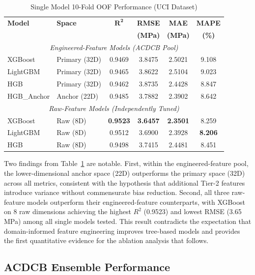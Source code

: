 \documentclass[journal]{IEEEtran}
\begin{document}
\begin{table}[!t]
\renewcommand{\arraystretch}{1.2}
\caption{Single Model 10-Fold OOF Performance (UCI Dataset)}
\label{tab:single_model}
\centering
\footnotesize
\begin{tabular}{lp{2.2cm}cccc}
\toprule
\textbf{Model} & \textbf{Space} & $\boldsymbol{R^2}$ & \textbf{RMSE} & \textbf{MAE} & \textbf{MAPE} \\
 & & & \textbf{(MPa)} & \textbf{(MPa)} & \textbf{(\%)} \\
\midrule
\multicolumn{6}{c}{\textit{Engineered-Feature Models (ACDCB Pool)}} \\
\midrule
XGBoost   & Primary (32D)  & 0.9469 & 3.8475 & 2.5021 & 9.108 \\
LightGBM  & Primary (32D)  & 0.9465 & 3.8622 & 2.5104 & 9.023 \\
HGB       & Primary (32D)  & 0.9462 & 3.8735 & 2.4428 & 8.847 \\
HGB\_Anchor & Anchor (22D)  & 0.9485 & 3.7882 & 2.3902 & 8.642 \\
\midrule
\multicolumn{6}{c}{\textit{Raw-Feature Models (Independently Tuned)}} \\
\midrule
XGBoost   & Raw (8D)       & \textbf{0.9523} & \textbf{3.6457} & \textbf{2.3501} & 8.259 \\
LightGBM  & Raw (8D)       & 0.9512 & 3.6900 & 2.3928 & \textbf{8.206} \\
HGB       & Raw (8D)       & 0.9498 & 3.7415 & 2.4481 & 8.451 \\
\bottomrule
\end{tabular}
\end{table}

Two findings from Table~\ref{tab:single_model} are notable. First, within the engineered-feature pool, the lower-dimensional anchor space (22D) outperforms the primary space (32D) across all metrics, consistent with the hypothesis that additional Tier-2 features introduce variance without commensurate bias reduction. Second, all three raw-feature models outperform their engineered-feature counterparts, with XGBoost on 8 raw dimensions achieving the highest $R^2$ (0.9523) and lowest RMSE (3.65\,MPa) among all single models tested. This result contradicts the expectation that domain-informed feature engineering improves tree-based models and provides the first quantitative evidence for the ablation analysis that follows.

\subsection{ACDCB Ensemble Performance}
\end{document}
